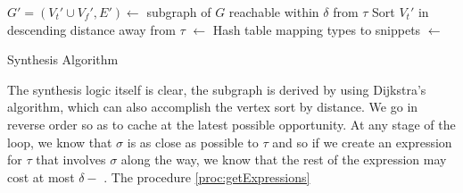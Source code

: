 \begin{algorithm}
\BlankLine
$G'=(V_t'\cup V_f', E') \longleftarrow$ subgraph of $G$ reachable within $\delta$ from $\tau$ \;
Sort $V_t'$ in descending distance away from $\tau$ \;
\Snips[$\sigma$] $\longleftarrow$ Hash table mapping types to snippets \;
\Exprs $\longleftarrow$ \Snips[$\tau$] \;
\caption{Synthesis Algorithm}\label{proc:synthesize}
\end{algorithm}

The synthesis logic itself is clear, the subgraph is derived by using Dijkstra's algorithm, which can also accomplish the vertex sort by distance. We go in reverse order so as to cache at the latest possible opportunity. At any stage of the loop, we know that $\sigma$ is as close as possible to $\tau$ and so if we create an expression for $\tau$ that involves $\sigma$ along the way, we know that the rest of the expression may cost at most $\delta - $ \Dist{$\sigma$}. The procedure \ref{proc:getExpressions} 
